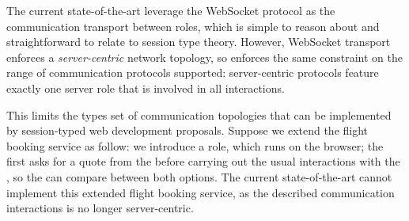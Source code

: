 The current state-of-the-art leverage the WebSocket protocol
as the communication transport between roles, which is
simple to reason about and straightforward to relate
to session type theory.
However, WebSocket transport enforces a \emph{server-centric}
network topology, so \cite{PureScript2019,MVU2020}
enforces the same constraint on the range of communication
protocols supported:
server-centric protocols feature exactly one server
role that is involved in all interactions.

This limits the types set of communication topologies
that can be implemented by session-typed web development
proposals. 
Suppose we extend the flight booking service as follow:
we introduce a  role, which
runs on the browser; the  first asks
for a quote from the  before 
carrying out the usual interactions with the ,
so the  can compare between both options.
The current state-of-the-art cannot implement this 
extended flight booking service, as the described
communication interactions is no longer server-centric.